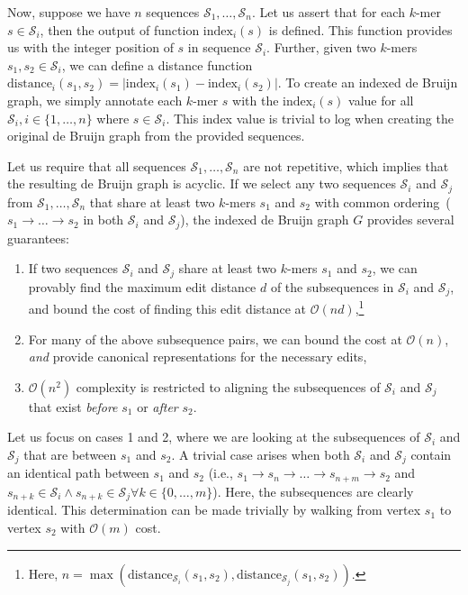 \documentclass[phd]{ucbthesis}
\begin{document}
Now, suppose we have $n$ sequences $\mathcal{S}_1, \dots, \mathcal{S}_n$. Let us assert that for each
$k$-mer $s \in \mathcal{S}_i$, then the output of function $\text{index}_i(s)$ is defined. This function
provides us with the integer position of $s$ in sequence $\mathcal{S}_i$. Further, given two $k$-mers
$s_1, s_2 \in \mathcal{S}_i$, we can define a distance function
$\text{distance}_i(s_1, s_2) = | \text{index}_i(s_1) - \text{index}_i(s_2) |$. To create an indexed
de Bruijn graph, we simply annotate each $k$-mer $s$ with the $\text{index}_i(s)$ value for all
$\mathcal{S}_i, i \in \{1, \dots, n\}$ where $s \in \mathcal{S}_i$. This index value is trivial to log when
creating the original de Bruijn graph from the provided sequences.

Let us require that all sequences $\mathcal{S}_1, \dots, \mathcal{S}_n$ are not repetitive, which implies
that the resulting de Bruijn graph is acyclic. If we select any two sequences $\mathcal{S}_i$ and
$\mathcal{S}_j$ from $\mathcal{S}_1, \dots, \mathcal{S}_n$ that share at least two $k$-mers $s_1$ and
$s_2$ with common ordering~($s_1 \rightarrow \dots \rightarrow s_2$ in both $\mathcal{S}_i$ and
$\mathcal{S}_j$), the indexed de Bruijn graph $G$ provides several guarantees:

\begin{enumerate}
\item If two sequences $\mathcal{S}_i$ and $\mathcal{S}_j$ share at least two $k$-mers $s_1$ and
$s_2$, we can provably find the maximum edit distance $d$ of the subsequences in $\mathcal{S}_i$ and
$\mathcal{S}_j$, and bound the cost of finding this edit distance at $\mathcal{O}(nd)$,\footnote{Here,
$n = \max(\text{distance}_{\mathcal{S}_i}(s_1, s_2), \text{distance}_{\mathcal{S}_j}(s_1, s_2))$.}
\item For many of the above subsequence pairs, we can bound the cost at $\mathcal{O}(n)$, \emph{and}
provide canonical representations for the necessary edits,
\item $\mathcal{O}(n^2)$ complexity is restricted to aligning the subsequences of $\mathcal{S}_i$ and
$\mathcal{S}_j$ that exist \emph{before} $s_1$ or \emph{after} $s_2$.
\end{enumerate}

Let us focus on cases 1 and 2, where we are looking at the subsequences of $\mathcal{S}_i$ and
$\mathcal{S}_j$ that are between $s_1$ and $s_2$. A trivial case arises when both $\mathcal{S}_i$ and
$\mathcal{S}_j$ contain an identical path between $s_1$ and $s_2$ (i.e.,
$s_1 \rightarrow s_n \rightarrow \dots \rightarrow s_{n + m} \rightarrow s_2$ and
$s_{n + k} \in \mathcal{S}_i \wedge s_{n + k} \in \mathcal{S}_j \forall k \in \{0, \dots , m\}$). Here, the
subsequences are clearly identical. This determination can be made trivially by walking from vertex $s_1$
to vertex $s_2$ with $\mathcal{O}(m)$ cost.
\end{document}
